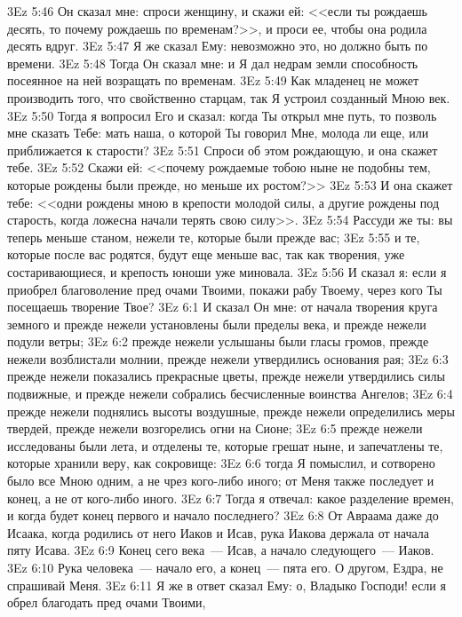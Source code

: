 \vs 3Ez 5:46 Он сказал мне: спроси женщину, и скажи ей: <<если ты рождаешь десять, то почему рождаешь по временам?>>, и проси ее, чтобы она родила десять вдруг.
\vs 3Ez 5:47 Я же сказал Ему: невозможно это, но должно быть по времени.
\vs 3Ez 5:48 Тогда Он сказал мне: и Я дал недрам земли способность посеянное на ней возращать по временам.
\vs 3Ez 5:49 Как младенец не может производить того, что свойственно старцам, так Я устроил созданный Мною век.
\vs 3Ez 5:50 Тогда я вопросил Его и сказал: когда Ты открыл мне путь, то позволь мне сказать Тебе: мать наша, о которой Ты говорил Мне, молода ли еще, или приближается к старости?
\vs 3Ez 5:51 Спроси об этом рождающую, и она скажет тебе.
\vs 3Ez 5:52 Скажи ей: <<почему рождаемые тобою ныне не подобны тем, которые рождены были прежде, но меньше их ростом?>>
\vs 3Ez 5:53 И она скажет тебе: <<одни рождены мною в крепости молодой силы, а другие рождены под старость, когда ложесна начали терять свою силу>>.
\vs 3Ez 5:54 Рассуди же ты: вы теперь меньше станом, нежели те, которые были прежде вас;
\vs 3Ez 5:55 и те, которые после вас родятся, будут еще меньше вас, так как творения, уже состаривающиеся, и крепость юноши уже миновала.
\vs 3Ez 5:56 И сказал я: если я приобрел благоволение пред очами Твоими, покажи рабу Твоему, через кого Ты посещаешь творение Твое?
\vs 3Ez 6:1 И сказал Он мне: от начала творения круга земного и прежде нежели установлены были пределы века, и прежде нежели подули ветры;
\vs 3Ez 6:2 прежде нежели услышаны были гласы громов, прежде нежели возблистали молнии, прежде нежели утвердились основания рая;
\vs 3Ez 6:3 прежде нежели показались прекрасные цветы, прежде нежели утвердились силы подвижные, и прежде нежели собрались бесчисленные воинства Ангелов;
\vs 3Ez 6:4 прежде нежели поднялись высоты воздушные, прежде нежели определились меры твердей, прежде нежели возгорелись огни на Сионе;
\vs 3Ez 6:5 прежде нежели исследованы были лета, и отделены те, которые грешат ныне, и запечатлены те, которые хранили веру, как сокровище:
\vs 3Ez 6:6 тогда Я помыслил, и сотворено было все Мною одним, а не чрез кого-либо иного; от Меня также последует и конец, а не от кого-либо иного.
\vs 3Ez 6:7 Тогда я отвечал: какое разделение времен, и когда будет конец первого и начало последнего?
\vs 3Ez 6:8 От Авраама даже до Исаака, когда родились от него Иаков и Исав, рука Иакова держала от начала пяту Исава.
\vs 3Ez 6:9 Конец сего века~--- Исав, а начало следующего~--- Иаков.
\vs 3Ez 6:10 Рука человека~--- начало его, а конец~--- пята его. О другом, Ездра, не спрашивай Меня.
\vs 3Ez 6:11 Я же в ответ сказал Ему: о, Владыко Господи! если я обрел благодать пред очами Твоими,
